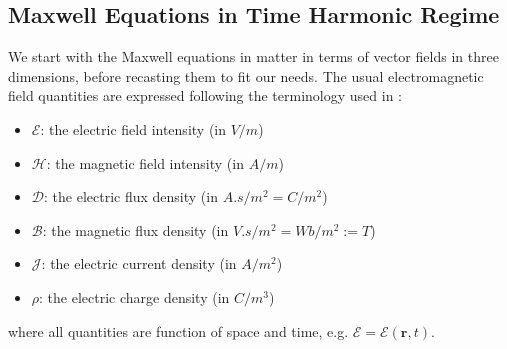 \subsection{Maxwell Equations in Time Harmonic Regime}
We start with the Maxwell equations in matter in terms of vector fields in three dimensions, before recasting them to fit our needs. The usual electromagnetic field quantities are expressed following the terminology used in :
\begin{itemize}
	\item $\boldsymbol{\mathcal{E}}$: the electric field intensity (in $\si{V/m}$)
	\item $\boldsymbol{\mathcal{H}}$: the magnetic field intensity (in $\si{A/m}$)
	\item $\boldsymbol{\mathcal{D}}$: the electric flux density (in $\si{A.s/m^2=C/m^2}$)
	\item $\boldsymbol{\mathcal{B}}$: the magnetic flux density (in $\si{V.s/m^2} = \si{Wb/m^2} := \si{T}$) 
	\item $\boldsymbol{\mathcal{J}}$: the electric current density (in $\si{A/m^2}$) 
	\item $\rho$: the electric charge density (in $\si{C/m^3}$)
\end{itemize}
where all quantities are function of space and time, e.g. $\boldsymbol{\mathcal{E}}=\boldsymbol{\mathcal{E}}(\mathbf{r},t)$. 

